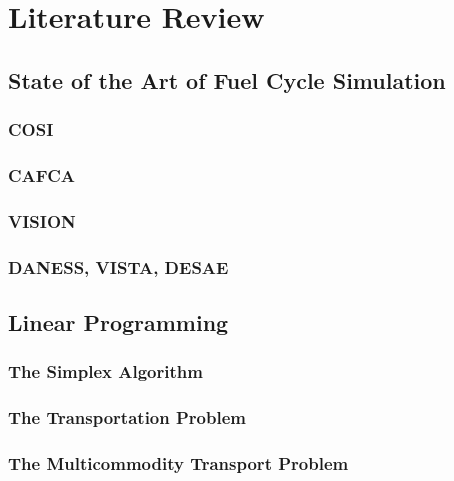 \chapter{Literature Review}\label{ch:litreview}

\section{State of the Art of Fuel Cycle Simulation}\label{sec:simulators}


\subsection{COSI}\label{sec:cosi}


\subsection{CAFCA}\label{sec:cafca}


\subsection{VISION}\label{sec:vision}


\subsection{DANESS, VISTA, DESAE}\label{sec:other-sims}


\section{Linear Programming}
\label{sec:lp-overview}

\subsection{The Simplex Algorithm}\label{sec:simplex}


\subsection{The Transportation Problem}\label{sec:xportation}


\subsection{The Multicommodity Transport Problem}\label{sec:MCTP}


